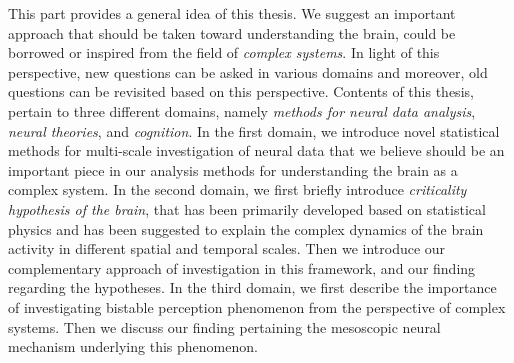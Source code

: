 \ctparttext
{
  This part provides a general idea of this thesis.
  We suggest an important approach that should be taken toward understanding the brain,
  could be borrowed or inspired from the field of \emph{complex systems}.
  In light of this perspective, new questions can be asked in various domains 
  and moreover, old questions can be revisited based on this perspective. 
  Contents of this thesis, pertain to three different domains, namely
  \textit{methods for  neural data analysis}, \textit{neural theories}, and \textit{cognition}.
  In the first domain, 
  we introduce novel statistical methods for multi-scale investigation of neural data
  that we believe should be an important piece in our analysis methods for understanding the brain as a complex system.
  In the second domain, we first briefly introduce
  \textit{criticality hypothesis of the brain},
  that has been primarily developed based on statistical physics 
  and has been suggested to explain the complex dynamics of the brain activity in different spatial and temporal scales.
  Then we introduce our complementary approach of investigation in this framework,
  and our finding regarding the hypotheses.
  In the third domain,
  we first describe the importance of investigating bistable perception phenomenon from the perspective of complex systems.
  Then we discuss our finding pertaining the mesoscopic neural mechanism underlying this phenomenon.
} %

